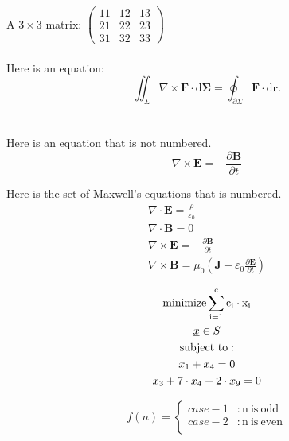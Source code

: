 A $3 \times 3$ matrix:
$\left(
\begin{array}{ccc}
	11 & 12 & 13 \\
	21 & 22 & 23 \\
	31 & 32 & 33
\end{array}
\right)$
\ \\
\ \\

Here is an equation:
\begin{equation}
\label{eqn:myeqnexample}
\iint_{\Sigma} \nabla \times \mathbf{F} \cdot \mathrm{d}\mathbf{\Sigma} = \oint_{\partial\Sigma} \mathbf{F} \cdot \mathrm{d} \mathbf{r}.
\end{equation}
\ \\
\ \\

Here is an equation that is not numbered.
\begin{equation*}
\nabla \times \mathbf{E} = -\frac{\partial \mathbf{B}} {\partial t}
\end{equation*}



Here is the set of Maxwell's equations that is numbered.
\begin{gather}
	\nabla \cdot \mathbf{E} = \frac {\rho} {\varepsilon_0} \\
	\nabla \cdot \mathbf{B} = 0 \\
	\nabla \times \mathbf{E} = -\frac{\partial \mathbf{B}} {\partial t} \\
	\nabla \times \mathbf{B} = \mu_0\left(\mathbf{J} + \varepsilon_0 \frac{\partial \mathbf{E}} {\partial t} \right)
\end{gather}


\begin{gather*}
	{\rm minimize \displaystyle\sum^{c}_{i = 1} c_{i} \cdot x_{i}} \\	%
	\underline{x} \in S \\
	{\rm subject\ to:} \\
	x_{1} + x_{4} = 0 \\
	x_{3} + 7 \cdot x_{4} + 2\cdot x_{9} = 0
\end{gather*}


\begin{equation}
\label{eqn:caseenv}
f(n) = 
	\begin{cases}
	case-1 &: \mathrm{n\ is\ odd} \\
	case-2 &: \mathrm{n\ is\ even} \\
	\end{cases}
\end{equation}

